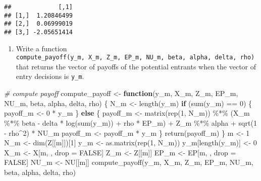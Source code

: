 \documentclass[
]{article}
\newenvironment{Shaded}{\begin{snugshade}}{\end{snugshade}}
\newcommand{\CommentTok}[1]{\textcolor[rgb]{0.56,0.35,0.01}{\textit{#1}}}
\newcommand{\ConstantTok}[1]{\textcolor[rgb]{0.00,0.00,0.00}{#1}}
\newcommand{\ControlFlowTok}[1]{\textcolor[rgb]{0.13,0.29,0.53}{\textbf{#1}}}
\newcommand{\DecValTok}[1]{\textcolor[rgb]{0.00,0.00,0.81}{#1}}
\newcommand{\FunctionTok}[1]{\textcolor[rgb]{0.00,0.00,0.00}{#1}}
\newcommand{\NormalTok}[1]{#1}
\newcommand{\OtherTok}[1]{\textcolor[rgb]{0.56,0.35,0.01}{#1}}
\newcommand{\SpecialCharTok}[1]{\textcolor[rgb]{0.00,0.00,0.00}{#1}}
\providecommand{\tightlist}{%
  \setlength{\itemsep}{0pt}\setlength{\parskip}{0pt}}
\begin{document}
\begin{verbatim}
##             [,1]
## [1,]  1.20846499
## [2,]  0.06999019
## [3,] -2.05651414
\end{verbatim}

\begin{enumerate}
\def\labelenumi{\arabic{enumi}.}
\setcounter{enumi}{3}
\tightlist
\item
  Write a function
  \texttt{compute\_payoff(y\_m,\ X\_m,\ Z\_m,\ EP\_m,\ NU\_m,\ beta,\ alpha,\ delta,\ rho)}
  that returns the vector of payoffs of the potential entrants when the
  vector of entry decisions is \texttt{y\_m}.
\end{enumerate}

\begin{Shaded}
\begin{Highlighting}[]
\CommentTok{\# compute payoff}
\NormalTok{compute\_payoff }\OtherTok{\textless{}{-}}
  \ControlFlowTok{function}\NormalTok{(y\_m, X\_m, Z\_m, EP\_m, NU\_m, beta, alpha, delta, rho) \{}
\NormalTok{    N\_m }\OtherTok{\textless{}{-}} \FunctionTok{length}\NormalTok{(y\_m)}
    \ControlFlowTok{if}\NormalTok{ (}\FunctionTok{sum}\NormalTok{(y\_m) }\SpecialCharTok{==} \DecValTok{0}\NormalTok{) \{}
\NormalTok{      payoff\_m }\OtherTok{\textless{}{-}} \DecValTok{0} \SpecialCharTok{*}\NormalTok{ y\_m}
\NormalTok{    \} }\ControlFlowTok{else}\NormalTok{ \{}
\NormalTok{      payoff\_m }\OtherTok{\textless{}{-}} \FunctionTok{matrix}\NormalTok{(}\FunctionTok{rep}\NormalTok{(}\DecValTok{1}\NormalTok{, N\_m)) }\SpecialCharTok{\%*\%}\NormalTok{ (X\_m }\SpecialCharTok{\%*\%}\NormalTok{ beta }\SpecialCharTok{{-}}\NormalTok{ delta }\SpecialCharTok{*} \FunctionTok{log}\NormalTok{(}\FunctionTok{sum}\NormalTok{(y\_m)) }\SpecialCharTok{+}\NormalTok{ rho }\SpecialCharTok{*}\NormalTok{ EP\_m) }\SpecialCharTok{+}\NormalTok{ Z\_m }\SpecialCharTok{\%*\%}\NormalTok{ alpha }\SpecialCharTok{+} \FunctionTok{sqrt}\NormalTok{(}\DecValTok{1} \SpecialCharTok{{-}}\NormalTok{ rho}\SpecialCharTok{\^{}}\DecValTok{2}\NormalTok{) }\SpecialCharTok{*}\NormalTok{ NU\_m }
\NormalTok{      payoff\_m }\OtherTok{\textless{}{-}}\NormalTok{ payoff\_m }\SpecialCharTok{*}\NormalTok{ y\_m}
\NormalTok{    \}}
    \FunctionTok{return}\NormalTok{(payoff\_m)}
\NormalTok{  \}}
\NormalTok{m }\OtherTok{\textless{}{-}} \DecValTok{1}
\NormalTok{N\_m }\OtherTok{\textless{}{-}} \FunctionTok{dim}\NormalTok{(Z[[m]])[}\DecValTok{1}\NormalTok{]}
\NormalTok{y\_m }\OtherTok{\textless{}{-}} \FunctionTok{as.matrix}\NormalTok{(}\FunctionTok{rep}\NormalTok{(}\DecValTok{1}\NormalTok{, N\_m))}
\NormalTok{y\_m[}\FunctionTok{length}\NormalTok{(y\_m)] }\OtherTok{\textless{}{-}} \DecValTok{0}
\NormalTok{X\_m }\OtherTok{\textless{}{-}}\NormalTok{ X[m, , drop }\OtherTok{=} \ConstantTok{FALSE}\NormalTok{]}
\NormalTok{Z\_m }\OtherTok{\textless{}{-}}\NormalTok{ Z[[m]]}
\NormalTok{EP\_m }\OtherTok{\textless{}{-}}\NormalTok{ EP[m, , drop }\OtherTok{=} \ConstantTok{FALSE}\NormalTok{]}
\NormalTok{NU\_m }\OtherTok{\textless{}{-}}\NormalTok{ NU[[m]]}
\FunctionTok{compute\_payoff}\NormalTok{(y\_m, X\_m, Z\_m, EP\_m, NU\_m, beta, alpha, delta, rho)}
\end{Highlighting}
\end{Shaded}
\end{document}
